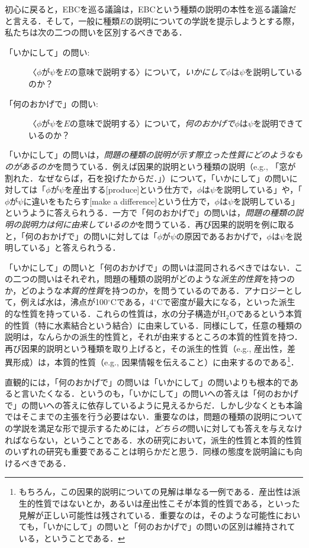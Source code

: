 \documentclass[dvipdfmx,twoside,11pt,uplatex]{jsarticle}
\theoremstyle{definition}
\begin{document}
初心に戻ると，EBCを巡る議論は，EBCという種類の説明の本性を巡る議論だと言える．そして，一般に種類$E$の説明についての学説を提示しようとする際，私たちは次の二つの問いを区別するべきである．
    \begin{description}
    \item[「いかにして」の問い:]〈$\phi$が$\psi$を$E$の意味で説明する〉について，\emph{いかにして}$\phi$は$\psi$を説明しているのか？
    \item[「何のおかげで」の問い:]〈$\phi$が$\psi$を$E$の意味で説明する〉について，\emph{何のおかげで}$\phi$は$\psi$を説明できているのか？
    \end{description}
「いかにして」の問いは，\emph{問題の種類の説明が示す際立った性質にどのようなものがあるのか}を問うている．例えば因果的説明という種類の説明（e.g., 「窓が割れた．なぜならば，石を投げたからだ．」）について，「いかにして」の問いに対しては「$\phi$が$\psi$を産出する[produce]という仕方で，$\phi$は$\psi$を説明している」や，「$\phi$が$\psi$に違いをもたらす[make a difference]という仕方で，$\phi$は$\psi$を説明している」というように答えられうる．一方で「何のおかげで」の問いは，\emph{問題の種類の説明の説明力は何に由来しているのか}を問うている．再び因果的説明を例に取ると，「何のおかげで」の問いに対しては「$\phi$が$\psi$の原因であるおかげで，$\phi$は$\psi$を説明している」と答えられうる．

「いかにして」の問いと「何のおかげで」の問いは混同されるべきではない．この二つの問いはそれぞれ，問題の種類の説明がどのような\emph{派生的性質}を持つのか，どのような\emph{本質的性質}を持つのか，を問うているのである．アナロジーとして，例えば水は，沸点が100$^\circ$Cである，4$^\circ$Cで密度が最大になる，といった派生的な性質を持っている．これらの性質は，水の分子構造が$\text{H}_2\text{O}$であるという本質的性質（特に水素結合という結合）に由来している．同様にして，任意の種類の説明は，なんらかの派生的性質と，それが由来するところの本質的性質を持つ．再び因果的説明という種類を取り上げると，その派生的性質（e.g., 産出性，差異形成）は，本質的性質（e.g., 因果情報を伝えること）に由来するのである\footnote{
もちろん，この因果的説明についての見解は単なる一例である．産出性は派生的性質ではないとか，あるいは産出性こそが本質的性質である，といった見解が正しい可能性は残されている．重要なのは，そのような可能性においても，「いかにして」の問いと「何のおかげで」の問いの区別は維持されている，ということである．
}．

直観的には，「何のおかげで」の問いは「いかにして」の問いよりも根本的であると言いたくなる．というのも，「いかにして」の問いへの答えは「何のおかげで」の問いへの答えに依存しているように見えるからだ．しかし少なくとも本論ではそこまでの主張を行う必要はない．重要なのは，問題の種類の説明についての学説を満足な形で提示するためには，\emph{どちらの}問いに対しても答えを与えなければならない，ということである．水の研究において，派生的性質と本質的性質のいずれの研究も重要であることは明らかだと思う．同様の態度を説明論にも向けるべきである．
\end{document}
